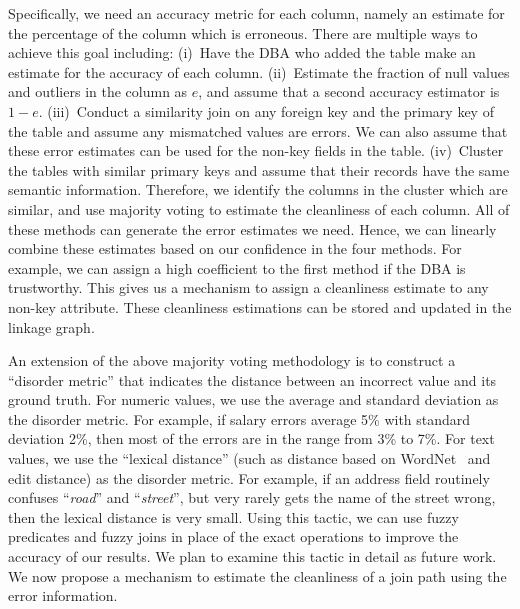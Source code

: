 \iffalse
Specifically, we need an accuracy metric for each column, namely an estimate for the percentage of the column which is erroneous. There are multiple ways to achieve this goal including: 
(i)~Have the DBA who added the table make an estimate for the accuracy of each column. 
(ii)~Estimate the fraction of null values and outliers in the column as $e$, and assume that a second accuracy estimator is $1-e$.
(iii)~Conduct a similarity join on any foreign key and the primary key of the table and assume any mismatched values are errors. We can also assume that these error estimates can be used for the non-key fields in the table. 
(iv)~Cluster the tables with similar primary keys and assume that their records have the same semantic information.  Therefore, we identify the columns in the cluster which are similar, and use majority voting to estimate the cleanliness of each column. 
All of these methods can generate the  error estimates we need. 
Hence, we can linearly combine these estimates based on our confidence in the four methods. For example, we can assign a high coefficient to the first method if the DBA is trustworthy. This gives us a mechanism to assign a cleanliness estimate to any non-key attribute. These cleanliness estimations can be stored and updated in the linkage graph.

An extension of the above majority voting methodology is to construct a ``disorder metric'' that indicates the distance between an incorrect value and its ground truth. For numeric values, we use the average and standard deviation as the disorder metric. For example, if salary errors average 5\% with standard deviation 2\%, then most of the errors are in the range from 3\% to 7\%. For text values, we use the ``lexical distance'' (such as distance based on WordNet~\cite{WordNet,DBLP:journals/cacm/Miller95} and edit distance) as the disorder metric. For example, if an address field routinely confuses ``\textit{road}'' and ``\textit{street}'', but very rarely gets the name of the street wrong, then the lexical distance is very small. Using this tactic, we can use fuzzy predicates and fuzzy joins in place of the exact operations to improve the accuracy of our results.
We plan to examine this tactic in detail as future work. We now propose a mechanism to estimate the cleanliness of a join path using the error information.


